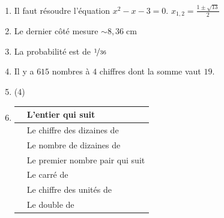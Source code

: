 \newcommand{\boup}{\guillemets{boucle pour} }
\everymath{\textstyle}
\begin{enumerate}[label=\thechapter.\arabic*., font=\bfseries, itemsep=10mm,labelsep*=3mm,left=0mm]
\item Il faut résoudre l'équation $x^2-x-3=0$. $\displaystyle x_{1,2}=\frac{1\pm\sqrt{13}}{2}$



\item Le dernier côté mesure $\sim 8,36\;\textrm{cm}$





\item La probabilité est de $\nicefrac{1}{36}$



\item Il y a $615$ nombres à $4$ chiffres dont la somme vaut $19$.



\item \leavevmode\vspace{-\dimexpr\baselineskip+\topsep}%
\begin{tasks}[after-item-skip=2mm,item-indent=5mm,column-sep=2mm](4)
\task {}
\task {}
\task {}
\task {}
\task {}
\task {}
\task {}
\task {}
\task {}
\task {}
\task {}
\task {}
\task {}
\task {}
\task {}
\task {}
\task {}
\task {}
\task {}
\task {}
\end{tasks}




\item \begin{minipage}[t][][b]{0.9\textwidth}\renewcommand{\arraystretch}{1.4}
\begin{tabular}{|C{3cm}|l|}
\hline
{}			&	L'entier qui suit 			\\
\hline
{}	&	Le chiffre des dizaines de 	\\
\hline
{}			&	Le nombre de dizaines de 		\\
\hline
{}		&	Le premier nombre pair qui suit 			\\
\hline
{}		&	Le carré de 						\\
\hline
{}		&	Le chiffre des unités de 					\\
\hline
{}			&	Le double de 					\\
\hline
\end{tabular}
\end{minipage}





\end{enumerate}
